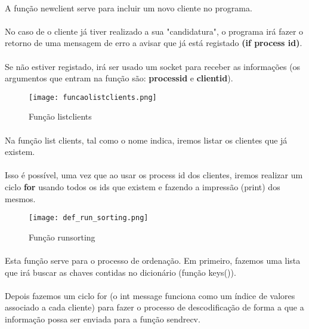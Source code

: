 \documentclass[a4paper,11pt,onecolumn,oneside]{article}
\begin{document}
\paragraph{ }
A função new\textunderscore client serve para incluir um novo cliente no programa.
\paragraph{ }
No caso de o cliente já tiver realizado a sua "candidatura", o programa irá fazer o retorno de uma mensagem de erro a avisar que já está registado \textbf{(if process id)}.
\paragraph{ }
Se não estiver registado, irá ser usado um socket para receber as informações (os argumentos que entram na função são: \textbf{process\textunderscore id} e \textbf{client\textunderscore id}).

\begin{figure} [h]
\center
\texttt{[image: funcaolistclients.png]}
\caption{Função list\textunderscore clients}
\label{list}
\end{figure}

\paragraph{ }
Na função list \textunderscore clients, tal como o nome indica, iremos listar os clientes que já existem.
\paragraph{ }
Isso é possível, uma vez que ao usar os process \textunderscore id dos clientes, iremos realizar um ciclo \textbf{for} usando todos os ids que existem e fazendo a impressão (print) dos mesmos.

\begin{figure} [h]
\center
\texttt{[image: def\_run\_sorting.png]}
\caption{Função run\textunderscore sorting}
\label{sorting}
\end{figure}

\paragraph{ }
Esta função serve para o processo de ordenação. Em primeiro, fazemos uma lista que irá buscar as chaves contidas no dicionário (função keys()).
\paragraph{ }
Depois fazemos um ciclo for (o int message funciona como um índice de valores associado a cada cliente) para fazer o processo de descodificação de forma a que a informação possa ser enviada para a função sendrecv. 
\end{document}
